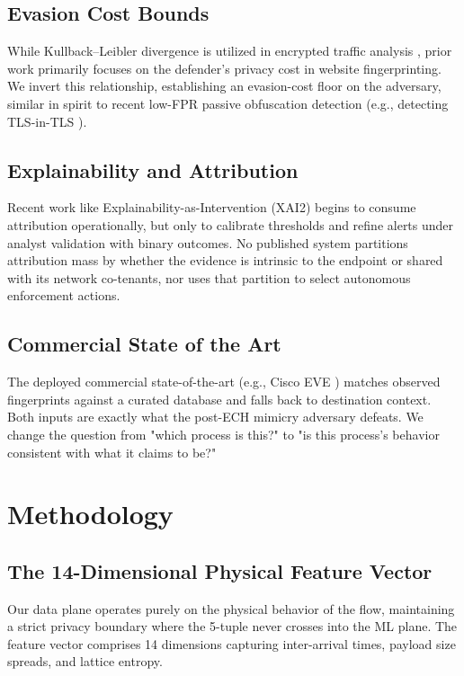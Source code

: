 \documentclass[10pt, conference]{IEEEtran}
\begin{document}
\subsection{Evasion Cost Bounds}
While Kullback--Leibler divergence is utilized in encrypted traffic analysis \cite{electronics2026}, prior work primarily focuses on the defender's privacy cost in website fingerprinting. We invert this relationship, establishing an evasion-cost floor on the adversary, similar in spirit to recent low-FPR passive obfuscation detection (e.g., detecting TLS-in-TLS \cite{xue2024}).

\subsection{Explainability and Attribution}
Recent work like Explainability-as-Intervention (XAI2) \cite{xai2026} begins to consume attribution operationally, but only to calibrate thresholds and refine alerts under analyst validation with binary outcomes. No published system partitions attribution mass by whether the evidence is intrinsic to the endpoint or shared with its network co-tenants, nor uses that partition to select autonomous enforcement actions.

\subsection{Commercial State of the Art}
The deployed commercial state-of-the-art (e.g., Cisco EVE \cite{cisco_eve}) matches observed fingerprints against a curated database and falls back to destination context. Both inputs are exactly what the post-ECH mimicry adversary defeats. We change the question from "which process is this?" to "is this process's behavior consistent with what it claims to be?"

\section{Methodology}

\subsection{The 14-Dimensional Physical Feature Vector}
Our data plane operates purely on the physical behavior of the flow, maintaining a strict privacy boundary where the 5-tuple never crosses into the ML plane. The feature vector comprises 14 dimensions capturing inter-arrival times, payload size spreads, and lattice entropy.
\end{document}

